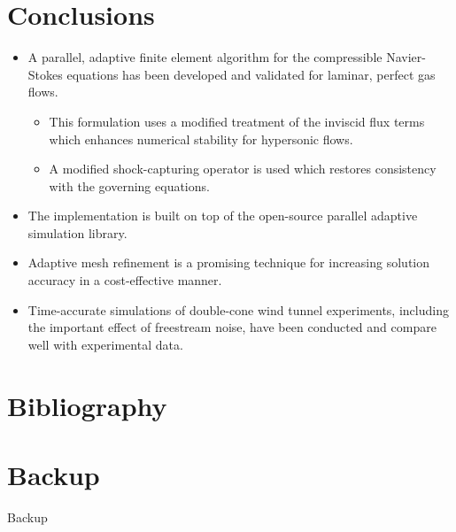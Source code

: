 \documentclass[compress,11pt]{beamer}
\begin{document}
\section{Conclusions}
\frame
{
  \begin{itemize}
    \item A parallel, adaptive finite element algorithm for the compressible Navier-Stokes equations has been developed and validated for laminar, perfect gas flows.
      \begin{itemize}
        \item This formulation uses a modified treatment of the inviscid flux terms which enhances numerical stability for hypersonic flows.
	\item A modified shock-capturing operator is used which restores consistency with the governing equations.
      \end{itemize}
    \item The  implementation is built on top of the \libMesh{} open-source parallel adaptive simulation library.
    \item Adaptive mesh refinement is a promising technique for increasing solution accuracy in a cost-effective manner.
    \item Time-accurate simulations of double-cone wind tunnel experiments, including the important effect of freestream noise, have been conducted and compare well with experimental data.
  \end{itemize}
}

\section*{Bibliography}
\begin{frame}[allowframebreaks]{}
  
  \vspace{-1em}
  \tiny
  
  \normalsize
\end{frame}

\section*{Backup}
\frame
{
  \vspace{4em}
  \centerline{\Huge{Backup}}
}
\end{document}
